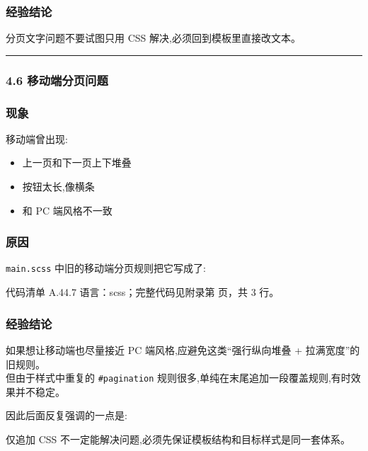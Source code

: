 \documentclass[lang=cn,scheme=chinese,color=blue,device=normal,toc=onecol,math=cm]{elegantbook}
\begin{document}
\subsubsection{经验结论}


分页文字问题不要试图只用 CSS 解决,必须回到模板里直接改文本。\par


\medskip\hrule\medskip


\subsubsection{4.6 移动端分页问题}


\subsubsection{现象}


移动端曾出现:\par


\begin{itemize}
\item 上一页和下一页上下堆叠
\item 按钮太长,像横条
\item 和 PC 端风格不一致
\end{itemize}


\subsubsection{原因}


\texttt{main.scss} 中旧的移动端分页规则把它写成了:\par


\begin{codeindexbox}{代码清单 A.44.7}
语言：scss；完整代码见附录第 \pageref{code:44:7} 页，共 3 行。
\end{codeindexbox}


\subsubsection{经验结论}


如果想让移动端也尽量接近 PC 端风格,应避免这类“强行纵向堆叠 + 拉满宽度”的旧规则。\\ 但由于样式中重复的 \texttt{\#pagination} 规则很多,单纯在末尾追加一段覆盖规则,有时效果并不稳定。\par


因此后面反复强调的一点是:\par


\begin{quotebox}
仅追加 CSS 不一定能解决问题,必须先保证模板结构和目标样式是同一套体系。\par
\end{quotebox}
\end{document}
